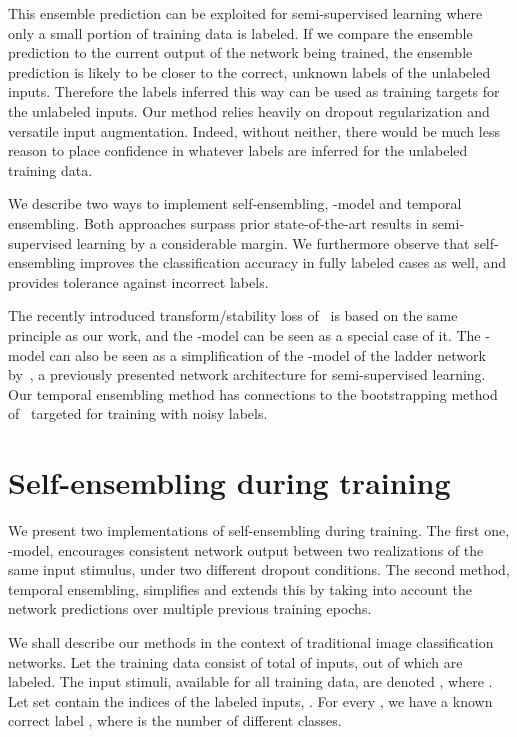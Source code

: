 \documentclass{article}
\begin{document}
This ensemble prediction can be exploited for semi-supervised learning where
only a small portion of training data is labeled. If we compare the ensemble prediction 
to the current output of the network being trained, the ensemble prediction is likely
to be closer to the correct, unknown labels of the unlabeled inputs. Therefore the
labels inferred this way can be used as training targets for the unlabeled inputs.
Our method relies heavily on dropout regularization and versatile input augmentation.
Indeed, without neither, there would be much less reason to place confidence in whatever
labels are inferred for the unlabeled training data.

We describe two ways to implement self-ensembling, -model and temporal ensembling.
Both approaches surpass prior state-of-the-art results in semi-supervised learning by a considerable margin. 
We furthermore observe that self-ensembling improves the classification accuracy in fully labeled cases as well, and provides tolerance against incorrect labels.

The recently introduced transform/stability loss of~\cite{sajjadi16} is based on the same
principle as our work, and the -model can be seen as a special case of it.
The -model can also be seen as a simplification of the
-model of the ladder network by~\cite{ladder}, a previously presented network
architecture for semi-supervised learning.
Our temporal ensembling method has connections to
the bootstrapping method of~\cite{reed14} targeted for training
with noisy labels.

\section{Self-ensembling during training}
\label{sec:selfens}

We present two implementations of self-ensembling during training. The first one, -model,
encourages consistent network output between two realizations of the same input
stimulus, under two different dropout conditions. The second method, temporal ensembling,
simplifies and extends this by taking into account the network predictions over multiple previous
training epochs.

We shall describe our methods in the context of traditional image classification networks.
Let the training data consist of total of  inputs, out of which  are labeled.
The input stimuli, available for all training data, are denoted , where .
Let set  contain the indices of the labeled inputs, . For every
, we have a known correct label , where 
is the number of different classes.
\end{document}
